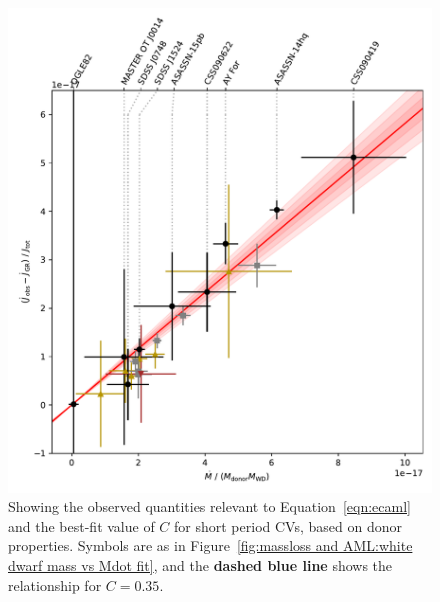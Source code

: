 \begin{figure}
    \centering
    \includegraphics[width=\textwidth]{figures/results/Mdot/eCAML_nu_with_intercept_fit.pdf}
    \caption{Showing the observed quantities relevant to Equation~\ref{eqn:ecaml} and the best-fit value of $C$ for short period CVs, based on donor properties. Symbols are as in Figure~\ref{fig:massloss and AML:white dwarf mass vs Mdot fit}, and the {\bf dashed blue line} shows the relationship for $C = 0.35$.}
    \label{fig:massloss and AML:calibrating ecaml relationship}
\end{figure}

